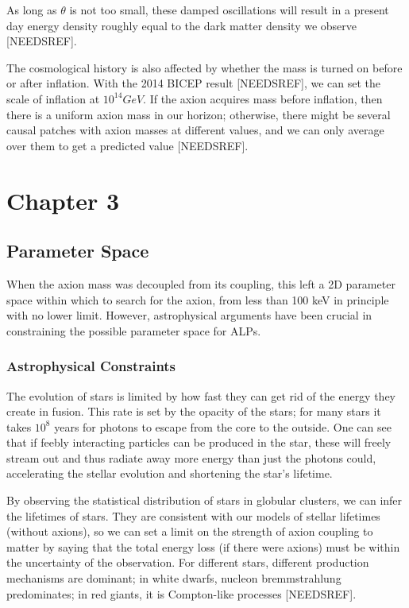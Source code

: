 \documentclass[12pt, twoside]{book}
\begin{document}
As long as $\theta$ is not too small, these damped oscillations will result in a present day energy density roughly equal to the dark matter density we observe [NEEDSREF].

The cosmological history is also affected by whether the mass is turned on before or after inflation. With the 2014 BICEP result [NEEDSREF], we can set the scale of inflation at $10^{14} GeV$. If the axion acquires mass before inflation, then there is a uniform axion mass in our horizon; otherwise, there might be several causal patches with axion masses at different values, and we can only average over them to get a predicted value [NEEDSREF].

\chapter{Chapter 3}
\section{Parameter Space}

When the axion mass was decoupled from its coupling, this left a 2D parameter space within which to search for the axion, from less than 100 keV in principle with no lower limit. However, astrophysical arguments have been crucial in constraining the possible parameter space for ALPs.

\subsection{Astrophysical Constraints}

The evolution of stars is limited by how fast they can get rid of the energy they create in fusion. This rate is set by the opacity of the stars; for many stars it takes $10^8$ years for photons to escape from the core to the outside. One can see that if feebly interacting particles can be produced in the star, these will freely stream out and thus radiate away more energy than just the photons could, accelerating the stellar evolution and shortening the star's lifetime.

By observing the statistical distribution of stars in globular clusters, we can infer the lifetimes of stars. They are consistent with our models of stellar lifetimes (without axions), so we can set a limit on the strength of axion coupling to matter by saying that the total energy loss (if there were axions) must be within the uncertainty of the observation. For different stars, different production mechanisms are dominant; in white dwarfs, nucleon bremmstrahlung predominates; in red giants, it is Compton-like processes [NEEDSREF].
\end{document}
